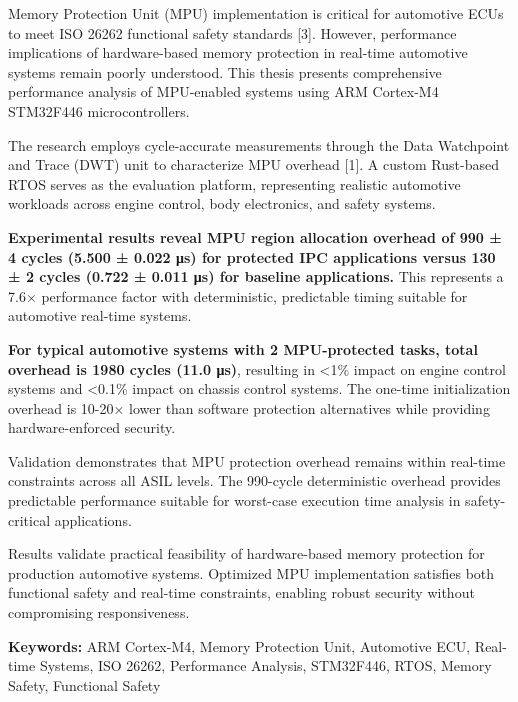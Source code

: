 \begin{EnglishAbstract}

Memory Protection Unit (MPU) implementation is critical for automotive ECUs to meet ISO 26262 functional safety standards [3]. However, performance implications of hardware-based memory protection in real-time automotive systems remain poorly understood. This thesis presents comprehensive performance analysis of MPU-enabled systems using ARM Cortex-M4 STM32F446 microcontrollers.

The research employs cycle-accurate measurements through the Data Watchpoint and Trace (DWT) unit to characterize MPU overhead [1]. A custom Rust-based RTOS serves as the evaluation platform, representing realistic automotive workloads across engine control, body electronics, and safety systems.

\textbf{Experimental results reveal MPU region allocation overhead of 990 ± 4 cycles (5.500 ± 0.022 μs) for protected IPC applications versus 130 ± 2 cycles (0.722 ± 0.011 μs) for baseline applications.} This represents a 7.6× performance factor with deterministic, predictable timing suitable for automotive real-time systems.

\textbf{For typical automotive systems with 2 MPU-protected tasks, total overhead is 1980 cycles (11.0 μs)}, resulting in <1\% impact on engine control systems and <0.1\% impact on chassis control systems. The one-time initialization overhead is 10-20× lower than software protection alternatives while providing hardware-enforced security.

Validation demonstrates that MPU protection overhead remains within real-time constraints across all ASIL levels. The 990-cycle deterministic overhead provides predictable performance suitable for worst-case execution time analysis in safety-critical applications.

Results validate practical feasibility of hardware-based memory protection for production automotive systems. Optimized MPU implementation satisfies both functional safety and real-time constraints, enabling robust security without compromising responsiveness.

\vspace{0.5cm}
\noindent \textbf{Keywords:} ARM Cortex-M4, Memory Protection Unit, Automotive ECU, Real-time Systems, ISO 26262, Performance Analysis, STM32F446, RTOS, Memory Safety, Functional Safety

\end{EnglishAbstract}